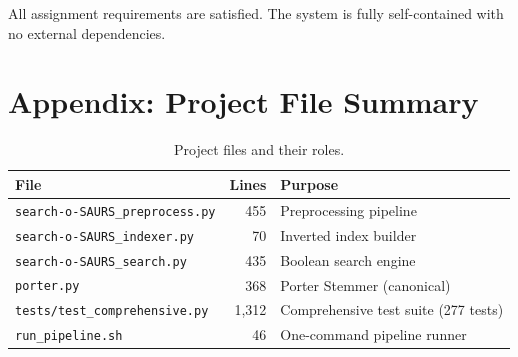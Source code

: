 \documentclass[12pt,a4paper]{article}
\begin{document}
All assignment requirements are satisfied.  The system is fully self-contained
with no external dependencies.

\section{Appendix: Project File Summary}
\label{sec:appendix}

\begin{table}[H]
\centering\small
\caption{Project files and their roles.}
\begin{tabular}{@{}l r l@{}}
\toprule
\textbf{File} & \textbf{Lines} & \textbf{Purpose} \\
\midrule
\texttt{search-o-SAURS\_preprocess.py} & 455 & Preprocessing pipeline \\
\texttt{search-o-SAURS\_indexer.py} & 70 & Inverted index builder \\
\texttt{search-o-SAURS\_search.py} & 435 & Boolean search engine \\
\texttt{porter.py} & 368 & Porter Stemmer (canonical) \\
\texttt{tests/test\_comprehensive.py} & 1,312 & Comprehensive test suite (277 tests) \\
\texttt{run\_pipeline.sh} & 46 & One-command pipeline runner \\
\bottomrule
\end{tabular}
\end{table}

\end{document}
